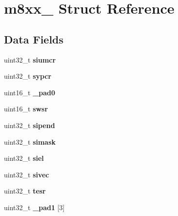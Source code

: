 \hypertarget{structm8xx__}{}\section{m8xx\+\_\+ Struct Reference}
\label{structm8xx__}
\subsection*{Data Fields}
\begin{DoxyCompactItemize}
\item 
\mbox{\label{structm8xx___a316848b85e064a04644d0c3ff9dd8c2b}} 
uint32\+\_\+t {\bfseries siumcr}
\item 
\mbox{\label{structm8xx___a604d5b8077f7f76d78a4ca14d8b9a9a5}} 
uint32\+\_\+t {\bfseries sypcr}
\item 
\mbox{\label{structm8xx___a9af7c834e2e653580bc6d6b03a769bc0}} 
uint16\+\_\+t {\bfseries \+\_\+pad0}
\item 
\mbox{\label{structm8xx___af5900aec0ba3a90fdebe7d4a25c76cd0}} 
uint16\+\_\+t {\bfseries swsr}
\item 
\mbox{\label{structm8xx___a0ec0f730bc252b3cb3d4e1eda83da7ff}} 
uint32\+\_\+t {\bfseries sipend}
\item 
\mbox{\label{structm8xx___a0c4c7a19dd2cea97af611eaee3a5e9a4}} 
uint32\+\_\+t {\bfseries simask}
\item 
\mbox{\label{structm8xx___a2f654e1395af5dbc947f4bbe81507fd1}} 
uint32\+\_\+t {\bfseries siel}
\item 
\mbox{\label{structm8xx___a701000f35105da1dadd7ef9541b466d8}} 
uint32\+\_\+t {\bfseries sivec}
\item 
\mbox{\label{structm8xx___a9df6ab2b43e6013a6b3235246951d01e}} 
uint32\+\_\+t {\bfseries tesr}
\item 
\mbox{\label{structm8xx___af69e6233926a34d18ecc8dd570b3c908}} 
uint32\+\_\+t {\bfseries \+\_\+pad1} \mbox{[}3\mbox{]}
\item 

\end{DoxyCompactItemize}
